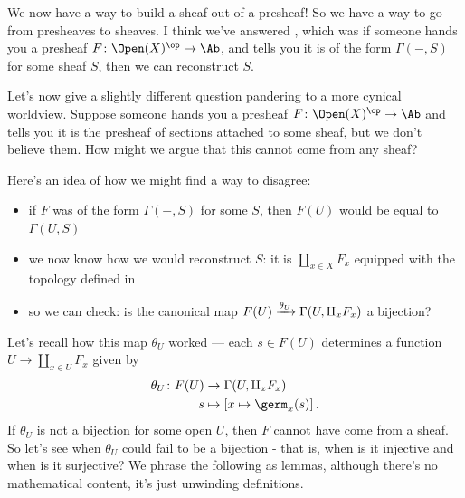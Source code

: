 \documentclass[11pt]{book}
\begin{document}
We now have a way to build a sheaf out of a presheaf! So we have a way to go from presheaves to sheaves. I think we've answered , which was if someone hands you a presheaf $F \colon \Open(X)^\op \to \Ab$, and tells you it is of the form $\Gamma(-,S)$ for some sheaf $S$, then we can reconstruct $S$.

Let's now give a slightly different question pandering to a more cynical worldview. Suppose someone hands you a presheaf $F \colon \Open(X)^\op \to \Ab$ and tells you it is the presheaf of sections attached to some sheaf, but we don't believe them. How might we argue that this cannot come from any sheaf?

Here's an idea of how we might find a way to disagree:
\begin{itemize}
    \item if $F$ was of the form $\Gamma(-,S)$ for some $S$, then $F(U)$ would be equal to $\Gamma(U,S)$
    \item we now know how we would reconstruct $S$: it is $\amalg_{x\in X}F_x$ equipped with the topology defined in 
    \item so we can check: is the canonical map $F(U) \xrightarrow{\theta_U} \Gamma(U, \amalg_x F_x)$ a bijection?
\end{itemize}
Let's recall how this map $\theta_U$ worked --- each $s\in F(U)$ determines a function $U \to \amalg_{x\in U}F_x$ given by
\begin{equation}\label{eqn:theta-U}
\begin{aligned}
    \theta_U \colon F(U) &\to \Gamma(U,\amalg_x F_x) \\
    s &\mapsto \left[ x \mapsto \germ_x(s) \right].
\end{aligned}
\end{equation}
If $\theta_U$ is not a bijection for some open $U$, then $F$ cannot have come from a sheaf. So let's see when $\theta_U$ could fail to be a bijection - that is, when is it injective and when is it surjective? We phrase the following as lemmas, although there's no mathematical content, it's just unwinding definitions.
\end{document}
